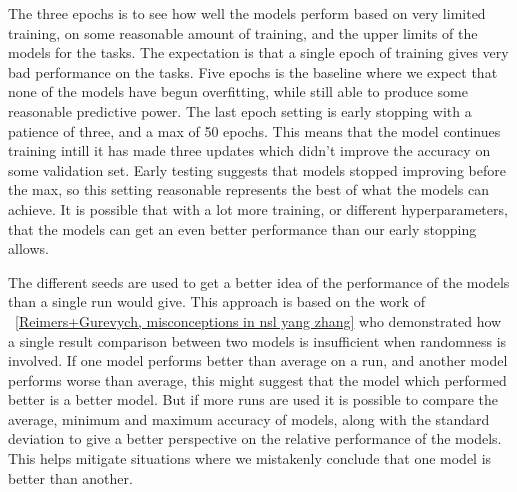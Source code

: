 The three epochs is to see how well the models perform based on very limited
training, on some reasonable amount of training, and the upper limits of the
models for the tasks. The expectation is that a single epoch of training gives
very bad performance on the tasks. Five epochs is the baseline where we expect
that none of the models have begun overfitting, while still able to produce some
reasonable predictive power. The last epoch setting is early stopping with a
patience of three, and a max of 50 epochs. This means that the model continues
training intill it has made three updates which didn't improve the accuracy on
some validation set. Early testing suggests that models stopped improving before
the max, so this setting reasonable represents the best of what the models can
achieve. It is possible that with a lot more training, or different
hyperparameters, that the models can get an even better performance than our
early stopping allows.

The different seeds are used to get a better idea of the performance of the
models than a single run would give. This approach is based on the work of
~\ref{Reimers+Gurevych, misconceptions in nsl yang zhang} who demonstrated how a
single result comparison between two models is insufficient when randomness is
involved. If one model performs better than average on a run, and another model
performs worse than average, this might suggest that the model which performed
better is a better model. But if more runs are used it is possible to compare
the average, minimum and maximum accuracy of models, along with the standard
deviation to give a better perspective on the relative performance of the
models. This helps mitigate situations where we mistakenly conclude that one
model is better than another.

%

